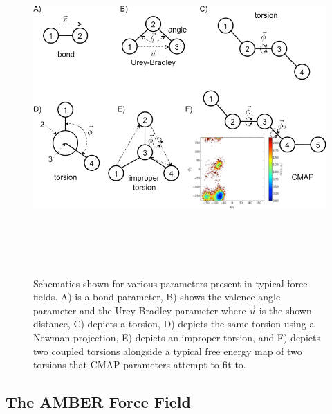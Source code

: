 \begin{figure}
   \includegraphics[width=7in,height=5in]{Parameters.png}
   \caption{Schematics shown for various parameters present in typical force
            fields. A) is a bond parameter, B) shows the valence angle parameter
            and the Urey-Bradley parameter where $\vec{u}$ is the shown
            distance, C) depicts a torsion, D) depicts the same torsion using a
            Newman projection, E) depicts an improper torsion, and F) depicts
            two coupled torsions alongside a typical free energy map of two
            torsions that CMAP parameters attempt to fit to.}
   \label{fig1:Parameters}
\end{figure}

\subsection{The AMBER Force Field}
